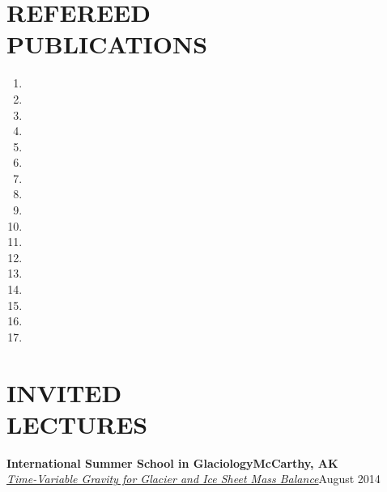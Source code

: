 \documentclass[margin,line,11pt]{res}
\begin{document}
\begin{resume}
\section{REFEREED\\ PUBLICATIONS}
	\begin{enumerate}
		\setlength{\itemindent}{-3ex}
		\item {}
		\item {}
		\item {}
		\item {}
		\item {}
		\item {}
		\item {}
		\item {}
		\item {}
		\item {}
		\item {}
		\item {}
		\item {}
		\item {}
		\item {}
		\item {}
		\item {}
	\end{enumerate}

\section{INVITED\\ LECTURES}
	{\bf International Summer School in Glaciology}\hfill {\bf McCarthy, AK}\\
	{\em \href{http://glaciers.gi.alaska.edu/sites/default/files/Lecture_GRACE_Sutterley2014.pdf}{Time-Variable Gravity for Glacier and Ice Sheet Mass Balance}}\hfill August 2014


\end{resume}
\end{document}
